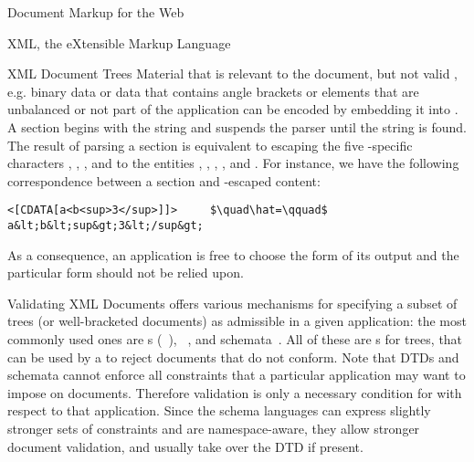 \begin{tchapter}[id=markup-web]{Document Markup for the Web}
\begin{tsection}[id=xml]{XML, the eXtensible Markup Language}
\begin{tsubsection}[id=xml-tree,short=XML Documents as Trees]{XML Document Trees}
Material that is relevant to the document, but not valid {\xml}, e.g.  binary data or data
that contains angle brackets or elements that are unbalanced or not part of the {\xml}
application can be encoded by embedding it into {}
{}. A {} section begins with the
string {\snippet{<[CDATA[}} and suspends the {\xml} parser until the string
{\snippet{]]>}} is found. The result of parsing a {} section is equivalent
to escaping the five {\xml}-specific characters {\snippet{<}},
{\snippet{>}} {}, {}, and {\snippet{\&}} to the {\xml}
entities {}, {},
{}, {}, and {}.  For instance, we
have the following correspondence between a {} section and {\xml}-escaped
content:
\begin{lstlisting}[mathescape]
<[CDATA[a<b<sup>3</sup>]]>     $\quad\hat=\qquad$     a&lt;b&lt;sup&gt;3&lt;/sup&gt;
\end{lstlisting}
As a consequence, an {\xml} application is free to choose the form of its output and the
particular form should not be relied upon.
\end{tsubsection}

\begin{tsubsection}[id=xml-validation,short=Validating XML Doucments]{Validating XML Documents}
  {\xml} offers various mechanisms for specifying a subset of trees (or well-bracketed
  {\xml} documents) as admissible in a given {\xml} application: the most commonly used
  ones are {s} ({}~\cite{Bray:XML97}), {\xml}
  {}~\cite{XML:Schema}, and {\relaxng}
  schemata~\cite{Vlist:rng03}. All of these are {s} for
  trees, that can be used by a {} to reject {\xml} documents
  that do not conform.  Note that DTDs and schemata cannot enforce all constraints that a
  particular {\xml} application may want to impose on documents.  Therefore validation is
  only a necessary condition for {} with respect to that application.
  Since the {\xml} schema languages can express slightly stronger sets of constraints and
  are namespace-aware, they allow stronger document validation, and usually take
  {} over the DTD if present.


\end{tsubsection}
\end{tsection}
\end{tchapter}
